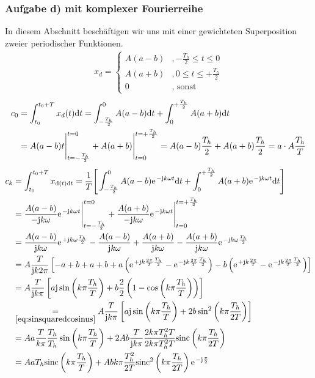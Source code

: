 \documentclass[11pt,a4paper,DIV=12]{scrartcl}
\newcommand{\sinc}{\mathrm{sinc}}
\begin{document}
\subsubsection{Aufgabe d) mit komplexer Fourierreihe}
%
In diesem Abschnitt beschäftigen wir uns mit einer gewichteten Superposition zweier
periodischer Funktionen.
%
%
\begin{align}
	x_d=
		\begin{cases}
			A(a-b)&,-\frac{T_h}{2}\leq t \leq 0 \\
			A(a+b)&,0\leq t \leq +\frac{T_h}{2}\\
			0&,\text{ sonst}
		\end{cases}
\end{align}
%
%
\begin{align}
	c_0&=\int_{t_0}^{t_0+T}x_d(t)\mathrm{d} t
	=\int_{-\frac{T_h}{2}}^0A(a-b)\mathrm{d} t+\int_0^{+\frac{T_h}{2}}A(a+b)\mathrm{d} t\nonumber \\
	&=A(a-b)t\Bigg |_{t=-\frac{T_h}{2}}^{t=0}+A(a+b)\Bigg |_{t=0}^{t=+\frac{T_h}{2}}
	=A(a-b)\frac{T_h}{2}+A(a+b)\frac{T_h}{2}=a\cdot A\frac{T_h}{T}
\end{align}
%
%
%
\begin{align}
	c_k&=\int_{t_0}^{t_0+T}x_{\diff (t)\diff t}
	=\frac{1}{T}\Bigg [\int_{-\frac{T_h}{2}}^0A(a-b)\e^{-\im k \omega t}\diff t+\int_0^{+\frac{T_h}{2}}A(a+b)\e^{-\im k \omega t}\diff t\Bigg ]\nonumber \\
	&=\frac{A(a-b)}{-\im k \omega}\e^{-\im k \omega t}\Bigg |_{t=-\frac{T_h}{2}}^{t=0}+\frac{A(a+b)}{-\im k \omega}\e^{-\im k \omega t}\Bigg |_{t=0}^{t=+\frac{T_h}{2}}\nonumber \\
	&=\frac{A(a-b)}{\im k \omega}\e^{+\im k \omega \frac{T_h}{2}}-\frac{A(a-b)}{\im k \omega}+\frac{A(a+b)}{\im k \omega}-\frac{A(a+b)}{\im k \omega}\e^{-\im k \omega \frac{T_h}{2}}\nonumber \\
	&=A\frac{T}{\im k 2\pi}\left [-a+b+a+b+a\left (\e^{+\im k \frac{2\pi}{T}\frac{T_h}{2}}-\e^{-\im k \frac{2\pi}{T}\frac{T_h}{2}}\right )-b\left (\e^{+\im k \frac{2\pi}{T}}-\e^{-\im k \frac{2\pi}{T}\frac{T_h}{2}}\right )\right ]\nonumber \\
	&=A\frac{T}{\im k\pi}\left [a\im\sin\left(k\pi\frac{T_h}{T}\right)+b\frac{2}{2}\left(1-\cos\left(k\pi\frac{T_h}{T}\right)\right)\right ]\nonumber\\
	&\underset{\ref{eq:sinsquaredcosinus}}{=}A\frac{T}{\im k\pi}\left[a\im\sin\left(k\pi\frac{T_h}{T}\right)+2b\sin^2\left(k\pi\frac{T_h}{2T}\right)\right]\nonumber\\
	&=Aa\frac{T}{k\pi}\frac{T_h}{T_h}\sin\left(k\pi\frac{T_h}{T}\right)+2Ab\frac{T}{\im k\pi}\frac{2k\pi T_h^2T}{2k\pi T_h^2T}\sinc\left(k\pi\frac{T_h}{2T}\right)\nonumber\\
	&=AaT_h\sinc\left(k\pi\frac{T_h}{T}\right)+Abk\pi\frac{T_h^2}{2T}\sinc^2\left(k\pi\frac{T_h}{2T}\right)\e^{-\im\frac{\pi}{2}}
\end{align}
\end{document}
